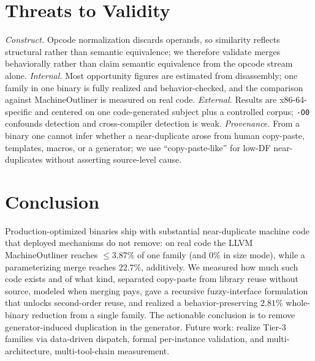 \documentclass[conference]{IEEEtran}
\begin{document}
\section{Threats to Validity}
\emph{Construct.} Opcode normalization discards operands, so similarity reflects
structural rather than semantic equivalence; we therefore validate merges
behaviorally rather than claim semantic equivalence from the opcode stream
alone. \emph{Internal.} Most opportunity figures are estimated from
disassembly; one family in one binary is fully realized and behavior-checked,
and the comparison against MachineOutliner is measured on real code.
\emph{External.} Results are x86-64-specific and centered on one
code-generated subject plus a controlled corpus; \texttt{-O0} confounds
detection and cross-compiler detection is weak. \emph{Provenance.} From a
binary one cannot infer whether a near-duplicate arose from human copy-paste,
templates, macros, or a generator; we use ``copy-paste-like'' for low-DF
near-duplicates without asserting source-level cause.

\section{Conclusion}
Production-optimized binaries ship with substantial near-duplicate machine code
that deployed mechanisms do not remove: on real code the LLVM MachineOutliner
reaches $\leq3.87\%$ of one family (and $0\%$ in size mode), while a
parameterizing merge reaches $22.7\%$, additively. We measured how much such
code exists and of what kind, separated copy-paste from library reuse without
source, modeled when merging pays, gave a recursive fuzzy-interface
formulation that unlocks second-order reuse, and realized a behavior-preserving
$2.81\%$ whole-binary reduction from a single family. The actionable
conclusion is to remove generator-induced duplication in the generator. Future
work: realize Tier-3 families via data-driven dispatch, formal per-instance
validation, and multi-architecture, multi-tool-chain measurement.



\end{document}
